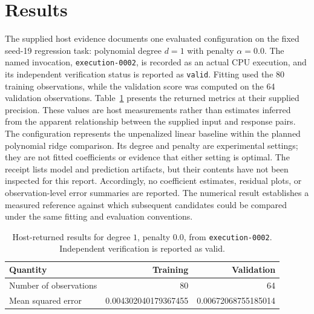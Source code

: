 \documentclass[11pt]{article}
\begin{document}
\section{Results}
The supplied host evidence documents one evaluated configuration on the fixed seed-19 regression task: polynomial degree \(d=1\) with penalty \(\alpha=0.0\). The named invocation, \texttt{execution-0002}, is recorded as an actual CPU execution, and its independent verification status is reported as \texttt{valid}. Fitting used the 80 training observations, while the validation score was computed on the 64 validation observations. Table~\ref{tab:measured-baseline} presents the returned metrics at their supplied precision. These values are host measurements rather than estimates inferred from the apparent relationship between the supplied input and response pairs. The configuration represents the unpenalized linear baseline within the planned polynomial ridge comparison. Its degree and penalty are experimental settings; they are not fitted coefficients or evidence that either setting is optimal. The receipt lists model and prediction artifacts, but their contents have not been inspected for this report. Accordingly, no coefficient estimates, residual plots, or observation-level error summaries are reported. The numerical result establishes a measured reference against which subsequent candidates could be compared under the same fitting and evaluation conventions.
\begin{table}[ht]
\centering
\begin{tabular}{lrr}
\hline
Quantity & Training & Validation \\
\hline
Number of observations & 80 & 64 \\
Mean squared error & 0.004302040179367455 & 0.00672068755185014 \\
\hline
\end{tabular}
\caption{Host-returned results for degree \(1\), penalty \(0.0\), from \texttt{execution-0002}. Independent verification is reported as valid.}
\label{tab:measured-baseline}
\end{table}
\end{document}
